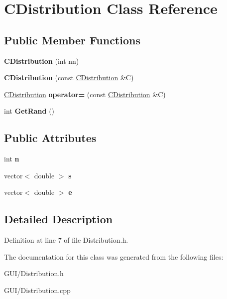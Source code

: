 \hypertarget{class_c_distribution}{}\section{C\+Distribution Class Reference}
\label{class_c_distribution}
\subsection*{Public Member Functions}
\begin{DoxyCompactItemize}
\item 
\mbox{\label{class_c_distribution_aea564c3ba0af2542a065bc939cd7058d}} 
{\bfseries C\+Distribution} (int nn)
\item 
\mbox{\label{class_c_distribution_a20dc1f35b4d97cf98deb534d13382ff1}} 
{\bfseries C\+Distribution} (const \hyperlink{class_c_distribution}{C\+Distribution} \&C)
\item 
\mbox{\label{class_c_distribution_a0ec0a84581bb0665b98460f100c11467}} 
\hyperlink{class_c_distribution}{C\+Distribution} {\bfseries operator=} (const \hyperlink{class_c_distribution}{C\+Distribution} \&C)
\item 
\mbox{\label{class_c_distribution_afcb7eb5b8851563fc50024597da56495}} 
int {\bfseries Get\+Rand} ()
\end{DoxyCompactItemize}
\subsection*{Public Attributes}
\begin{DoxyCompactItemize}
\item 
\mbox{\label{class_c_distribution_a9c42c15cbfd99d6bf476dd5494849ad5}} 
int {\bfseries n}
\item 
\mbox{\label{class_c_distribution_a7bc8d091b14a4b7fd97628f93dbc28a7}} 
vector$<$ double $>$ {\bfseries s}
\item 
\mbox{\label{class_c_distribution_a645508c235431bfda6bf47a02f4b731b}} 
vector$<$ double $>$ {\bfseries e}
\end{DoxyCompactItemize}


\subsection{Detailed Description}


Definition at line 7 of file Distribution.\+h.



The documentation for this class was generated from the following files\+:\begin{DoxyCompactItemize}
\item 
G\+U\+I/Distribution.\+h\item 
G\+U\+I/Distribution.\+cpp\end{DoxyCompactItemize}
